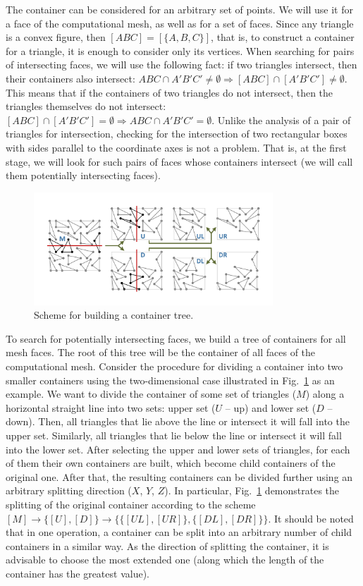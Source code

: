 \documentclass[
11pt,
tightenlines,
twoside,
onecolumn,
nofloats,
nobibnotes,
nofootinbib,
superscriptaddress,
noshowpacs,
centertags]
{revtex4-2}
\begin{document}
The container can be considered for an arbitrary set of points.
We will use it for a face of the computational mesh, as well as for a set of faces.
Since any triangle is a convex figure, then $[ABC] = [\{A, B, C\}]$, that is, to construct a container for a triangle, it is enough to consider only its vertices.
When searching for pairs of intersecting faces, we will use the following fact: if two triangles intersect, then their containers also intersect: $ABC \cap A'B'C' \ne \emptyset \Rightarrow [ABC] \cap [A'B'C'] \ne\emptyset$.
This means that if the containers of two triangles do not
intersect, then the triangles themselves do not intersect: $[ABC]
\cap [A'B'C'] = \emptyset \Rightarrow ABC \cap A'B'C' = \emptyset$.
Unlike the analysis of a pair of triangles for intersection,
checking for  the intersection of two rectangular boxes with sides
parallel to the coordinate axes is not a problem.
That is, at the first stage, we will look for such pairs of faces
whose  containers intersect (we will call them potentially
intersecting faces).

\begin{figure}[h]
\includegraphics[width=0.8\textwidth]{pics/pic_box_size.pdf}
\caption{Scheme for building a container tree.}\label{fig:pic_box}
\end{figure}

To search for potentially intersecting faces, we build a tree of
containers  for all mesh faces.
The root of this tree will be the container of all faces of the
computational  mesh.
Consider the procedure for dividing a container into two smaller
containers  using the two-dimensional case illustrated in
Fig.~\ref{fig:pic_box} as an example.
We want to divide the container of some set of triangles ($M$) along
a  horizontal straight line into two sets: upper set ($U$ -- up) and
lower set ($D$ -- down).
Then, all triangles that lie above the line or intersect it will
fall into the upper set.
Similarly, all triangles that lie below the line or intersect it will fall into the lower set.
After selecting the upper and lower sets of triangles, for each of them their own containers are built, which become child containers of the original one.
After that, the resulting containers can be divided further using an arbitrary splitting direction ($X$, $Y$, $Z$).
In particular, Fig.~\ref{fig:pic_box} demonstrates the splitting of the original container according to the scheme $[M] \rightarrow \{[U], [D]\} \rightarrow \{\{[UL], [UR]\}, \{[DL], [DR]\}\}$.
It should be noted that in one operation, a container can be split into an arbitrary number of child containers in a similar way.
As the direction of splitting the container, it is advisable to choose the most extended one (along which the length of the container has the greatest value).
\end{document}
